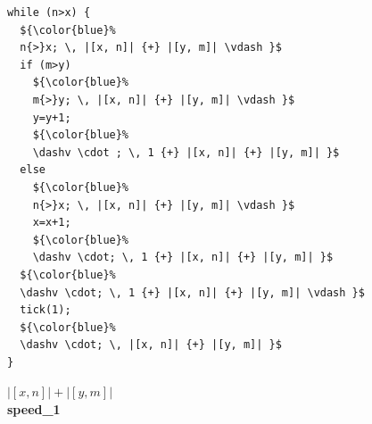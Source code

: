 \documentclass[nocopyrightspace,preprint,pldi]{sigplanconf-pldi15}
\begin{document}
\begin{figure}
 \setlength{\progwidth}{.22\linewidth}
  \centering
\vspace{-.8cm}
\hspace{-0.4cm}
  \begin{minipage}[b]{.18\linewidth}
    \begin{center}
   \begin{lstlisting}[]
while (n>x) {
  ${\color{blue}%
  n{>}x; \, |[x, n]| {+} |[y, m]| \vdash }$
  if (m>y)
    ${\color{blue}%
    m{>}y; \, |[x, n]| {+} |[y, m]| \vdash }$
    y=y+1;
    ${\color{blue}%
    \dashv \cdot ; \, 1 {+} |[x, n]| {+} |[y, m]| }$
  else
    ${\color{blue}%
    n{>}x; \, |[x, n]| {+} |[y, m]| \vdash }$
    x=x+1;
    ${\color{blue}%
    \dashv \cdot; \, 1 {+} |[x, n]| {+} |[y, m]| }$
  ${\color{blue}%
  \dashv \cdot; \, 1 {+} |[x, n]| {+} |[y, m]| \vdash }$
  tick(1);
  ${\color{blue}%
  \dashv \cdot; \, |[x, n]| {+} |[y, m]| }$
}
   \end{lstlisting}
\vspace{-2.5ex}
$|[x, n]| + |[y, m]|$
\\[.4\baselineskip]
      {\bf speed\_1}
    \end{center}
  \end{minipage}
%
\hfill
%
  \begin{minipage}[b]{\progwidth}
    \begin{center}
   \begin{lstlisting}


\end{lstlisting}
\end{center}
\end{minipage}
\end{figure}
\end{document}
